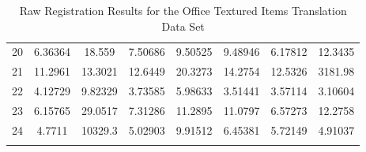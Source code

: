 \begin{center}
\begin{longtable}{cccccccc}
20 & 6.36364 & 18.559 & 7.50686 & 9.50525 & 9.48946 & 6.17812 & 12.3435\\
21 & 11.2961 & 13.3021 & 12.6449 & 20.3273 & 14.2754 & 12.5326 & 3181.98\\
22 & 4.12729 & 9.82329 & 3.73585 & 5.98633 & 3.51441 & 3.57114 & 3.10604\\
23 & 6.15765 & 29.0517 & 7.31286 & 11.2895 & 11.0797 & 6.57273 & 12.2758\\
24 & 4.7711 & 10329.3 & 5.02903 & 9.91512 & 6.45381 & 5.72149 & 4.91037\\
\caption{Raw Registration Results for the Office Textured Items Translation Data Set}
\label{tab:officetextureditemstranslationFULL}
\end{longtable}
\end{center}


